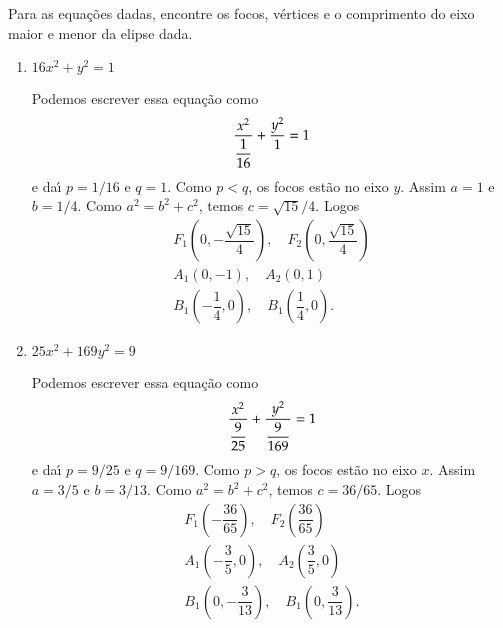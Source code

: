 \begin{exemplos}
  Para as equa\c{c}\~oes dadas, encontre os focos, v\'ertices e o comprimento do eixo maior e menor da elipse dada.
  \begin{enumerate}
    \item $16x^2 + y^2 = 1$
    \begin{solucao}
      Podemos escrever essa equa\c{c}\~ao como
      \[
        \dfrac{x^2}{\dfrac{1}{16}} + \dfrac{y^2}{1} = 1
      \]
      e da{\'\i} $p = 1/16$ e $q = 1$. Como $p < q$, os focos est\~ao no eixo $y$. Assim $a = 1$ e $b = 1/4$. Como $a^2 = b^2 + c^2$, temos $c = \sqrt{15}/4$. Logos
      \begin{align*}
        F_1\left(0,-\dfrac{\sqrt{15}}{4}\right),\quad F_2\left(0,\dfrac{\sqrt{15}}{4}\right)\\
        A_1(0,-1),\quad A_2(0,1)\\
        B_1\left(-\dfrac{1}{4},0\right),\quad B_1\left(\dfrac{1}{4},0\right).
      \end{align*}
    \end{solucao}
    \item $25x^2 + 169y^2 = 9$
    \begin{solucao}
      Podemos escrever essa equa\c{c}\~ao como
      \[
        \dfrac{x^2}{\dfrac{9}{25}} + \dfrac{y^2}{\dfrac{9}{169}} = 1
      \]
      e da{\'\i} $p = 9/25$ e $q = 9/169$. Como $p > q$, os focos est\~ao no eixo $x$. Assim $a = 3/5$ e $b = 3/13$. Como $a^2 = b^2 + c^2$, temos $c = 36/65$. Logos
      \begin{align*}
        F_1\left(-\dfrac{36}{65}\right),\quad F_2\left(\dfrac{36}{65}\right)\\
        A_1\left(-\dfrac{3}{5},0\right),\quad A_2\left(\dfrac{3}{5},0\right)\\
        B_1\left(0,-\dfrac{3}{13}\right),\quad B_1\left(0,\dfrac{3}{13}\right).
      \end{align*}
    \end{solucao}
  \end{enumerate}
\end{exemplos}

